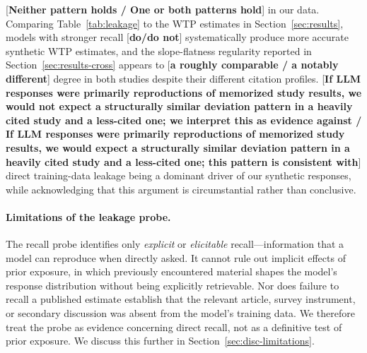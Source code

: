 \documentclass[12pt]{article}
\begin{document}
[\textbf{Neither pattern holds / One or both patterns hold}] in our data. Comparing Table~\ref{tab:leakage} to the WTP estimates in Section~\ref{sec:results}, models with stronger recall [\textbf{do/do not}] systematically produce more accurate synthetic WTP estimates, and the slope-flatness regularity reported in Section~\ref{sec:results-cross} appears to [\textbf{a roughly comparable / a notably different}] degree in both studies despite their different citation profiles. [\textbf{If LLM responses were primarily reproductions of memorized study results, we would not expect a structurally similar deviation pattern in a heavily cited study and a less-cited one; we interpret this as evidence against / If LLM responses were primarily reproductions of memorized study results, we would expect a structurally similar deviation pattern in a heavily cited study and a less-cited one; this pattern is consistent with}] direct training-data leakage being a dominant driver of our synthetic responses, while acknowledging that this argument is circumstantial rather than conclusive.

\paragraph{Limitations of the leakage probe.} The recall probe identifies only \emph{explicit} or \emph{elicitable}
recall---information that a model can reproduce when directly asked. It
cannot rule out implicit effects of prior exposure, in which previously
encountered material shapes the model's response distribution without
being explicitly retrievable. Nor does failure to recall a published
estimate establish that the relevant article, survey instrument, or
secondary discussion was absent from the model's training data. We
therefore treat the probe as evidence concerning direct recall, not as a
definitive test of prior exposure. We discuss this further in Section~\ref{sec:disc-limitations}.
\end{document}
